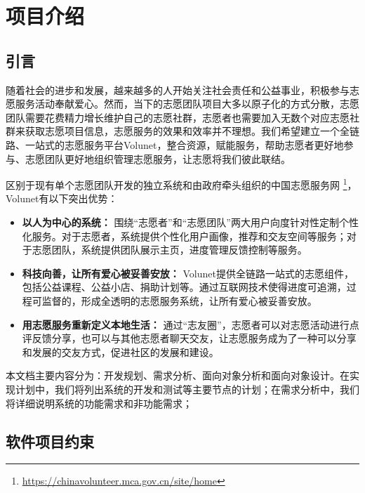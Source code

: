 \section{项目介绍}
\subsection{引言}
随着社会的进步和发展，越来越多的人开始关注社会责任和公益事业，积极参与志愿服务活动奉献爱心。然而，当下的志愿团队项目大多以原子化的方式分散，志愿团队需要花费精力增长维护自己的志愿社群，志愿者也需要加入无数个对应志愿社群来获取志愿项目信息，志愿服务的效果和效率并不理想。我们希望建立一个全链路、一站式的志愿服务平台Volunet，整合资源，赋能服务，帮助志愿者更好地参与、志愿团队更好地组织管理志愿服务，让志愿将我们彼此联结。

区别于现有单个志愿团队开发的独立系统和由政府牵头组织的中国志愿服务网 \footnote{\href{https://chinavolunteer.mca.gov.cn/site/home}{https://chinavolunteer.mca.gov.cn/site/home}}，Volunet有以下突出优势：

\begin{itemize}[itemsep=2pt,topsep=2pt,parsep=4pt,itemindent=2em]
    \item \textbf{以人为中心的系统：} 围绕“志愿者”和“志愿团队”两大用户向度针对性定制个性化服务。对于志愿者，系统提供个性化用户画像，推荐和交友空间等服务；对于志愿团队，系统提供团队展示主页，进度管理反馈控制等服务。
    \item \textbf{科技向善，让所有爱心被妥善安放：} Volunet提供全链路一站式的志愿组件，包括公益课程、公益小店、捐助计划等。通过互联网技术使得进度可追溯，过程可监督的，形成全透明的志愿服务系统，让所有爱心被妥善安放。
    \item \textbf{用志愿服务重新定义本地生活：} 通过“志友圈”，志愿者可以对志愿活动进行点评反馈分享，也可以与其他志愿者聊天交友，让志愿服务成为了一种可以分享和发展的交友方式，促进社区的发展和建设。\\
\end{itemize}


本文档主要内容分为：开发规划、需求分析、面向对象分析和面向对象设计。在实现计划中，我们将列出系统的开发和测试等主要节点的计划；在需求分析中，我们将详细说明系统的功能需求和非功能需求；


\subsection{软件项目约束}

